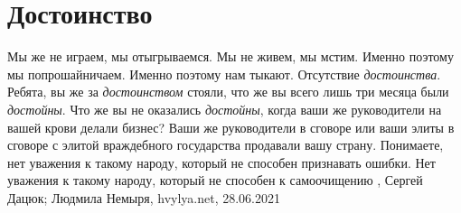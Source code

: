  
 
 
 
 
\chapter{Достоинство}

Мы же не играем, мы отыгрываемся. Мы не живем, мы мстим. Именно поэтому мы
попрошайничаем. Именно поэтому нам тыкают. Отсутствие \emph{достоинства}. Ребята, вы
же за \emph{достоинством} стояли, что же вы всего лишь три месяца были \emph{достойны}. Что
же вы не оказались \emph{достойны}, когда ваши же руководители на вашей крови делали
бизнес? Ваши же руководители в сговоре или ваши элиты в сговоре с элитой
враждебного государства продавали вашу страну. Понимаете, нет уважения к такому
народу, который не способен признавать ошибки. Нет уважения к такому народу,
который не способен к самоочищению
, 
Сергей Дацюк; Людмила Немыря, hvylya.net, 28.06.2021

